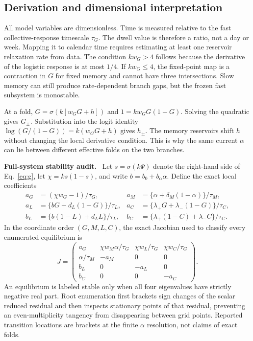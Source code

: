 \documentclass[10pt,a4paper]{article}
\newcommand{\inlinehead}[1]{\par\smallskip\noindent\textbf{#1}\ }
\begin{document}
\begin{appendices}
\section{Derivation and dimensional interpretation}

All model variables are dimensionless. Time is measured relative to the fast collective-response timescale $\tau_G$. The dwell value is therefore a ratio, not a day or week. Mapping it to calendar time requires estimating at least one reservoir relaxation rate from data. The condition $kw_G>4$ follows because the derivative of the logistic response is at most $1/4$. If $kw_G\leq4$, the fixed-point map is a contraction in $G$ for fixed memory and cannot have three intersections. Slow memory can still produce rate-dependent branch gaps, but the frozen fast subsystem is monostable.

At a fold, $G=\sigma(k[w_GG+h])$ and $1=kw_GG(1-G)$. Solving the quadratic gives $G_\pm$. Substitution into the logit identity $\log(G/(1-G))=k(w_GG+h)$ gives $h_\pm$. The memory reservoirs shift $h$ without changing the local derivative condition. This is why the same current $\alpha$ can lie between different effective folds on the two branches.

\inlinehead{Full-system stability audit.} Let $s=\sigma(k\Psi)$ denote the right-hand side of Eq.~\eqref{eq:g}, let $\chi=ks(1-s)$, and write $b=b_0+b_\alpha\alpha$. Define the exact local coefficients
\begin{align}
a_G&=(\chi w_G-1)/\tau_G,
&a_M&=\{\alpha+\delta_M(1-\alpha)\}/\tau_M,\nonumber\\
a_L&=\{bG+d_L(1-G)\}/\tau_L,
&a_C&=\{\lambda_+G+\lambda_-(1-G)\}/\tau_C,\nonumber\\
b_L&=\{b(1-L)+d_LL\}/\tau_L,
&b_C&=\{\lambda_+(1-C)+\lambda_-C\}/\tau_C.\nonumber
\end{align}
In the coordinate order $(G,M,L,C)$, the exact Jacobian used to classify every enumerated equilibrium is
\begin{equation}
J=
\begin{pmatrix}
a_G & \chi w_M\alpha/\tau_G & \chi w_L/\tau_G & \chi w_C/\tau_G\\
\alpha/\tau_M & -a_M & 0 & 0\\
b_L & 0 & -a_L & 0\\
b_C & 0 & 0 & -a_C
\end{pmatrix}.
\label{eq:full-jacobian}
\end{equation}
An equilibrium is labeled stable only when all four eigenvalues have strictly negative real part. Root enumeration first brackets sign changes of the scalar reduced residual and then inspects stationary points of that residual, preventing an even-multiplicity tangency from disappearing between grid points. Reported transition locations are brackets at the finite $\alpha$ resolution, not claims of exact folds.


\end{appendices}
\end{document}

